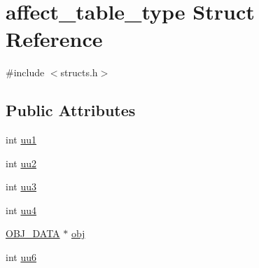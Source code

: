 \hypertarget{structaffect__table__type}{\section{affect\-\_\-table\-\_\-type Struct Reference}
\label{structaffect__table__type}
}


{\ttfamily \#include $<$structs.\-h$>$}

\subsection*{Public Attributes}
\begin{DoxyCompactItemize}
\item 
int \hyperlink{structaffect__table__type_a8c38c178a0ece5ef7d6fc112ad75bb90}{uu1}
\item 
int \hyperlink{structaffect__table__type_a22a0b69158737bacc1bf91e61029717e}{uu2}
\item 
int \hyperlink{structaffect__table__type_aaa0866244c05c72d3df1eda5350d93e3}{uu3}
\item 
int \hyperlink{structaffect__table__type_a6b9c22c73d122493d36c039cce1e6e92}{uu4}
\item 
\hyperlink{structs_8h_aaa59141dfc8c6ecdb6bfcf1537dd52d1}{O\-B\-J\-\_\-\-D\-A\-T\-A} $\ast$ \hyperlink{structaffect__table__type_a44016d5bfa098899c9afa9bf397668a1}{obj}
\item 
int \hyperlink{structaffect__table__type_aa47ec4b4ee8d20202a044673e8165882}{uu6}
\end{DoxyCompactItemize}


